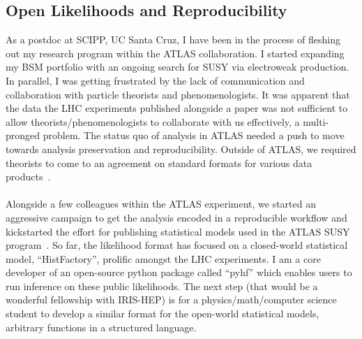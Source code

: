 \documentclass[10pt,a4paper,sans]{moderncv} %
\begin{document}
\subsection{Open Likelihoods and Reproducibility}
As a postdoc at SCIPP, UC Santa Cruz, I have been in the process of fleshing out my research program within the ATLAS collaboration. I started expanding my BSM portfolio with an ongoing search for SUSY via electroweak production. In parallel, I was getting frustrated by the lack of communication and collaboration with particle theorists and phenomenologists. It was apparent that the data the LHC experiments published alongside a paper was not sufficient to allow theorists/phenomenologists to collaborate with us effectively, a multi-pronged problem. The status quo of analysis in ATLAS needed a push to move towards analysis preservation and reproducibility. Outside of ATLAS, we required theorists to come to an agreement on standard formats for various data products~\cite{Cranmer:2021urp, Heinrich2021}.
\\
\\
Alongside a few colleagues within the ATLAS experiment, we started an aggressive campaign to get the analysis encoded in a reproducible workflow and kickstarted the effort for publishing statistical models used in the ATLAS SUSY program~\cite{ATL-PHYS-PUB-2019-029}. So far, the likelihood format has focused on a closed-world statistical model, ``HistFactory'', prolific amongst the LHC experiments. I am a core developer of an open-source python package called ``pyhf'' which enables users to run inference on these public likelihoods. The next step (that would be a wonderful fellowship with IRIS-HEP) is for a physics/math/computer science student to develop a similar format for the open-world statistical models, arbitrary functions in a structured language.
\end{document}
